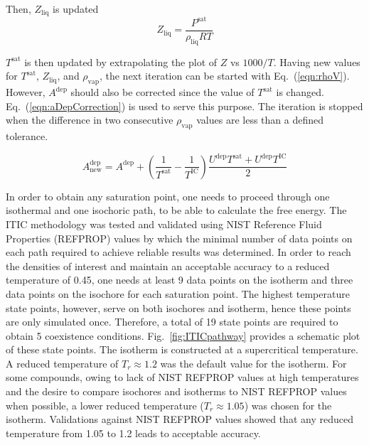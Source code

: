 \documentclass[%
 aip,
 jcp,
 sd,%
 amsmath,amssymb,
 reprint,%
]{revtex4-1}
\begin{document}
Then, $Z_\mathrm{liq}$ is updated 
\begin{equation}
{Z_{\mathrm{liq}}} = \frac{P^\mathrm{sat}}{\rho_\mathrm{liq}RT}  
\label{eqn:zliq}
\end{equation}

$T^\mathrm{sat}$ is then updated by extrapolating the plot of $Z$ vs $1000/T$. Having new values for $T^\mathrm{sat}$, $Z_{\mathrm{liq}}$, and $\rho_\mathrm{vap}$, the next iteration can be started with Eq.~(\ref{eqn:rhoV}). However, $A^\mathrm{dep}$ should also be corrected since the value of $T^\mathrm{sat}$ is changed. Eq.~(\ref{eqn:aDepCorrection}) is used to serve this purpose. The iteration is stopped when the difference in two consecutive $\rho_\mathrm{vap}$ values are less than a defined tolerance. 

\begin{equation}
A^\mathrm{dep}_\mathrm{new} = A^\mathrm{dep} + \left( \frac{1}{T^\mathrm{sat}}-\frac{1}{T^\mathrm{IC}} \right) \frac{U^\mathrm{dep}T^\mathrm{sat}+U^\mathrm{dep}T^\mathrm{IC}}{2} 
\label{eqn:aDepCorrection}
\end{equation}

In order to obtain any saturation point, one needs to proceed through one isothermal and one isochoric path, to be able to calculate the free energy. The ITIC methodology was tested and validated using NIST Reference Fluid Properties (REFPROP) \cite{LEMMON-RP91} values by which the minimal number of data points on each path required to achieve reliable results was determined. In order to reach the densities of interest and maintain an acceptable accuracy to a reduced temperature of 0.45, one needs at least 9 data points on the isotherm and three data points on the isochore for each saturation point. The highest temperature state points, however, serve on both isochores and isotherm, hence these points are only simulated once. Therefore, a total of 19 state points are required to obtain 5 coexistence conditions. Fig.~\ref{fig:ITICpathway} provides a schematic plot of these state points. The isotherm is constructed at a supercritical temperature. A reduced temperature of $T_{r} \approx 1.2$ was the default value for the isotherm. For some compounds, owing to lack of NIST REFPROP values at high temperatures and the desire to compare isochores and isotherms to NIST REFPROP values when possible, a lower reduced temperature ($T_{r} \approx 1.05$) was chosen for the isotherm. Validations against NIST REFPROP values showed that any reduced temperature from 1.05 to 1.2 leads to acceptable accuracy.
\end{document}
